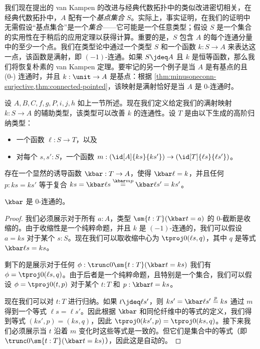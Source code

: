 {%
我们现在提出的 van Kampen 的改进与经典代数拓扑中的类似改进密切相关，在经典代数拓扑中，$A$ 配有一个\emph{基点集合} $S$。实际上，事实证明，在我们的证明中无需假设“基点集合”是一个\emph{集合}——它可能是一个任意类型；假设 $S$ 是一个集合的实用性在于稍后的应用定理以获得计算。重要的是，$S$ 包含 $A$ 的每个连通分量中的至少一个点。我们在类型论中通过一个类型 $S$ 和一个函数 $k:S \to A$ 来表达这一点，该函数是满射，即 $(-1)$-连通。如果 $S\jdeq A$ 且 $k$ 是恒等函数，那么我们将恢复朴素的 van Kampen 定理。要牢记的另一个例子是当 $A$ 是有基点的且 (0-) 连通时，并且 $k:\unit\to A$ 是基点：根据 \cref{thm:minusoneconn-surjective,thm:connected-pointed}，该映射是满射恰好是当 $A$ 是 0-连通时。

设 $A,B,C,f,g,P,i,j,h$ 如上一节所述。现在我们定义给定我们的满射映射 $k:S\to A$ 的辅助类型，该类型可以改善 $k$ 的连通性。设 $T$ 是由以下生成的高阶归纳类型：
\begin{itemize}
  \item 一个函数 $\ell:S\to T$，以及
  \item 对每个 $s,s':S$，一个函数 $m:(\id[A]{ks}{ks'}) \to (\id[T]{\ell s}{\ell s'})$。
\end{itemize}
存在一个显然的诱导函数 $\kbar:T\to A$，使得 $\kbar \ell = k$，并且任何 $p:ks=ks'$ 等于复合 $ks = \kbar \ell s \overset{\kbar m p}{=} \kbar \ell s' = k s'$。

\begin{lem}\label{thm:kbar}
$\kbar$ 是 0-连通的。
\end{lem}
\begin{proof}
  我们必须展示对于所有 $a:A$，类型 $\sm{t:T}(\kbar t = a)$ 的 0-截断是收缩的。由于收缩性是一个纯粹命题，并且 $k$ 是 $(-1)$-连通的，我们可以假设 $a=ks$ 对于某个 $s:S$。现在我们可以取收缩中心为 $\tproj0{(\ell s,q)}$，其中 $q$ 是等式 $\kbar\ell s = k s$。

  剩下的是展示对于任何 $\phi:\trunc0{\sm{t:T} (\kbar t = ks)}$ 我们有 $\phi = \tproj0{(\ell s,q)}$。由于后者是一个纯粹命题，且特别是一个集合，我们可以假设 $\phi=\tproj0{(t,p)}$ 对于某个 $t:T$ 和 $p:\kbar t = ks$。

  现在我们可以对 $t:T$ 进行归纳。如果 $t\jdeq\ell s'$，则 $ks' = \kbar \ell s' \overset{p}{=} ks$ 通过 $m$ 得到一个等式 $\ell s = \ell s'$。因此根据 $\kbar$ 和同伦纤维中的等式的定义，我们得到等式 $(ks',p) = (ks,q)$，因此 $\tproj0{(ks',p)} = \tproj0{(ks,q)}$。接下来我们必须展示当 $t$ 沿着 $m$ 变化时这些等式是一致的。但它们是集合中的等式（即 $\trunc0{\sm{t:T} (\kbar t = ks)}$），因此这是自动的。
\end{proof}

}
